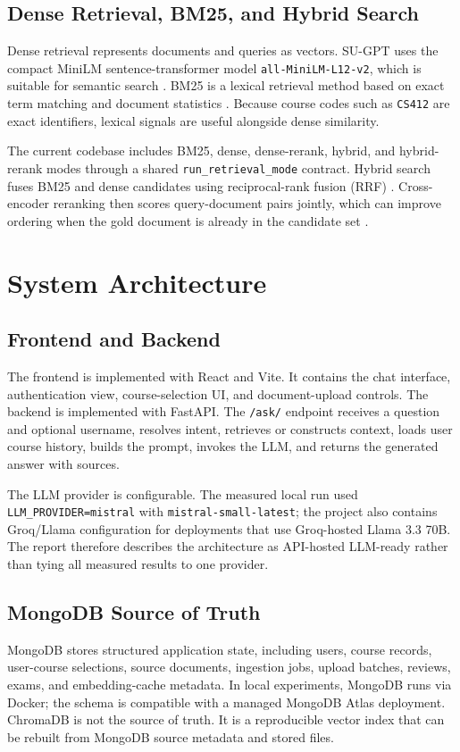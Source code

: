 \documentclass[11pt]{article}
\begin{document}
\subsection{Dense Retrieval, BM25, and Hybrid Search}
Dense retrieval represents documents and queries as vectors. SU-GPT uses the compact MiniLM sentence-transformer model \texttt{all-MiniLM-L12-v2}, which is suitable for semantic search \cite{reimers2019sentencebert}. BM25 is a lexical retrieval method based on exact term matching and document statistics \cite{robertson2009bm25}. Because course codes such as \texttt{CS412} are exact identifiers, lexical signals are useful alongside dense similarity.

The current codebase includes BM25, dense, dense-rerank, hybrid, and hybrid-rerank modes through a shared \texttt{run\_retrieval\_mode} contract. Hybrid search fuses BM25 and dense candidates using reciprocal-rank fusion (RRF) \cite{cormack2009rrf}. Cross-encoder reranking then scores query-document pairs jointly, which can improve ordering when the gold document is already in the candidate set \cite{nogueira2019passage}.

\section{System Architecture}


\subsection{Frontend and Backend}
The frontend is implemented with React and Vite. It contains the chat interface, authentication view, course-selection UI, and document-upload controls. The backend is implemented with FastAPI. The \texttt{/ask/} endpoint receives a question and optional username, resolves intent, retrieves or constructs context, loads user course history, builds the prompt, invokes the LLM, and returns the generated answer with sources.

The LLM provider is configurable. The measured local run used \texttt{LLM\_PROVIDER=mistral} with \texttt{mistral-small-latest}; the project also contains Groq/Llama configuration for deployments that use Groq-hosted Llama 3.3 70B. The report therefore describes the architecture as API-hosted LLM-ready rather than tying all measured results to one provider.

\subsection{MongoDB Source of Truth}
MongoDB stores structured application state, including users, course records, user-course selections, source documents, ingestion jobs, upload batches, reviews, exams, and embedding-cache metadata. In local experiments, MongoDB runs via Docker; the schema is compatible with a managed MongoDB Atlas deployment. ChromaDB is not the source of truth. It is a reproducible vector index that can be rebuilt from MongoDB source metadata and stored files.
\end{document}
